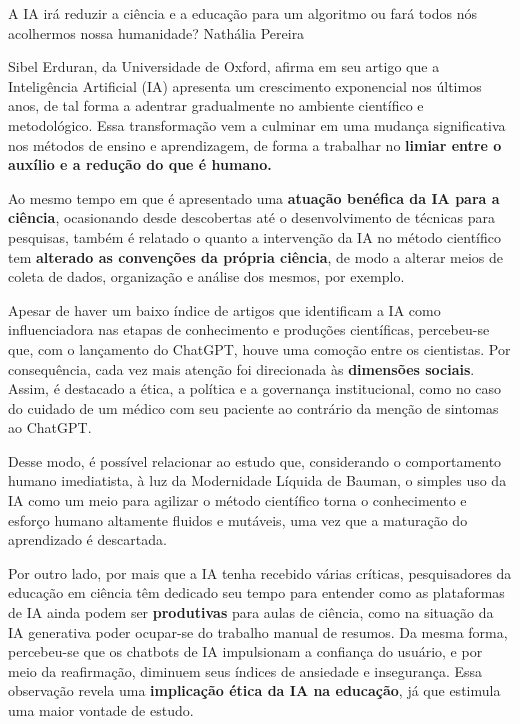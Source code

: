 \hypearticle
{A IA irá reduzir a ciência e a educação para um algoritmo ou fará todos nós acolhermos nossa humanidade?}
{Nathália Pereira}
{

\subtitle{O impacto da IA}
    \hspace{1cm}Sibel Erduran, da Universidade de Oxford, afirma em seu artigo que a Inteligência Artificial (IA) apresenta um crescimento exponencial nos últimos anos,
de tal forma a adentrar gradualmente no ambiente científico e metodológico. Essa transformação vem a culminar em uma mudança significativa nos métodos de
ensino e aprendizagem, de forma a trabalhar no \textbf{limiar entre o auxílio e a redução do que é humano.}

\subtitle{Contextualização}
    \hspace{1cm}Ao mesmo tempo em que é apresentado uma \textbf{atuação benéfica da IA para a ciência}, ocasionando
desde descobertas até o desenvolvimento de técnicas para pesquisas, também é relatado o quanto a intervenção da IA no método científico
tem \textbf{alterado as convenções da própria ciência}, de modo a alterar meios de coleta de dados, organização e análise dos mesmos, por exemplo.

    \hspace{1cm}Apesar de haver um baixo índice de artigos que identificam a IA como influenciadora nas etapas de conhecimento e produções científicas, percebeu-se
que, com o lançamento do ChatGPT, houve uma comoção entre os cientistas. Por consequência, cada vez mais atenção foi direcionada às \textbf{dimensões
sociais}. Assim, é destacado a ética, a política e a governança institucional, como no caso do cuidado de um médico com seu paciente ao contrário da menção de sintomas ao ChatGPT.

\subtitle{Análise crítica}
    \hspace{1cm}Desse modo, é possível relacionar ao estudo que, considerando o comportamento humano imediatista, à luz da Modernidade Líquida de Bauman, o simples uso da IA
como um meio para agilizar o método científico torna o conhecimento e esforço humano altamente fluidos e mutáveis, uma vez que a maturação do aprendizado é descartada.


\subtitle{Outra visão}
    \hspace{1cm}Por outro lado, por mais que a IA tenha recebido várias críticas, pesquisadores da educação em ciência têm dedicado seu tempo para entender como
 as plataformas de IA ainda podem ser \textbf{produtivas} para aulas de ciência, como na situação da IA generativa poder ocupar-se do trabalho manual de resumos.
Da mesma forma, percebeu-se que os chatbots de IA impulsionam a confiança do usuário, e por meio da reafirmação, diminuem seus índices de ansiedade e insegurança.
 Essa observação revela uma \textbf{implicação ética da IA na educação}, já que estimula uma maior vontade de estudo.

}
